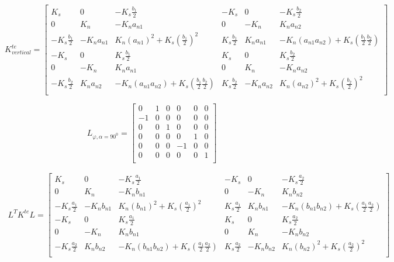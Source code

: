 \begin{equation}
K^{te}_{vertical} = 
\begin{bmatrix}
K_s & 0 & -K_s \frac{b_1}{2} & -K_s & 0 & -K_s \frac{b_2}{2} \\

0 & K_n & -K_n a_{n1} & 0 & -K_n & K_n a_{n2} \\

-K_s \frac{b_1}{2} & -K_n a_{n1} & K_n (a_{n1})^2 + K_s (\frac{b_1}{2})^2 & K_s \frac{b_{1}}{2} & K_n a_{n1} & -K_n (a_{n1} a_{n2}) + K_s (\frac{b_1}{2} \frac{b_2}{2}) \\

-K_s & 0 & K_s \frac{b_1}{2} & K_s & 0 & K_s \frac{b_2}{2}  \\

0 & -K_n & K_n a_{n1} & 0 & K_n & -K_n a_{n2} \\

-K_s \frac{b_2}{2} & K_n a_{n2} & -K_n (a_{n1} a_{n2}) + K_s (\frac{b_1}{2} \frac{b_2}{2}) & K_s \frac{b_2}{2} & -K_n a_{n2} & K_n (a_{n2})^2 + K_s (\frac{b_2}{2})^2 \\
\end{bmatrix}
\label{eq:Kte vert}
\end{equation}

\begin{equation}
L_{\varphi,\alpha=90^0} = 
\begin{bmatrix}
0 & 1 & 0 & 0 & 0 & 0 \\
- 1 & 0 & 0 & 0 & 0 & 0 \\
0 & 0 & 1 & 0 & 0 & 0 \\
0 & 0 & 0 & 0 & 1 & 0 \\
0 & 0 & 0 & - 1 & 0 & 0 \\
0 & 0 & 0 & 0 & 0 & 1 \\
\end{bmatrix}
\end{equation}

\begin{eqnarray}
L^T K^{te} L =
\begin{bmatrix}
K_s & 0 & -K_s \frac{a_1}{2} & -K_s & 0 & -K_s \frac{a_2}{2} \\

0 & K_n & -K_n b_{n1} & 0 & -K_n & K_n b_{n2} \\

-K_s \frac{a_1}{2} & -K_n b_{n1} & K_n (b_{n1})^2 + K_s (\frac{a_1}{2})^2 & K_s \frac{a_{1}}{2} & K_n b_{n1} & -K_n (b_{n1} b_{n2}) + K_s (\frac{a_1}{2} \frac{a_2}{2}) \\

-K_s & 0 & K_s \frac{a_1}{2} & K_s & 0 & K_s \frac{a_2}{2}  \\

0 & -K_n & K_n b_{n1} & 0 & K_n & -K_n b_{n2} \\

-K_s \frac{a_2}{2} & K_n b_{n2} & -K_n (b_{n1} b_{n2}) + K_s (\frac{a_1}{2} \frac{a_2}{2}) & K_s \frac{a_2}{2} & -K_n b_{n2} & K_n (b_{n2})^2 + K_s (\frac{a_2}{2})^2 \\
\end{bmatrix}
\end{eqnarray}

